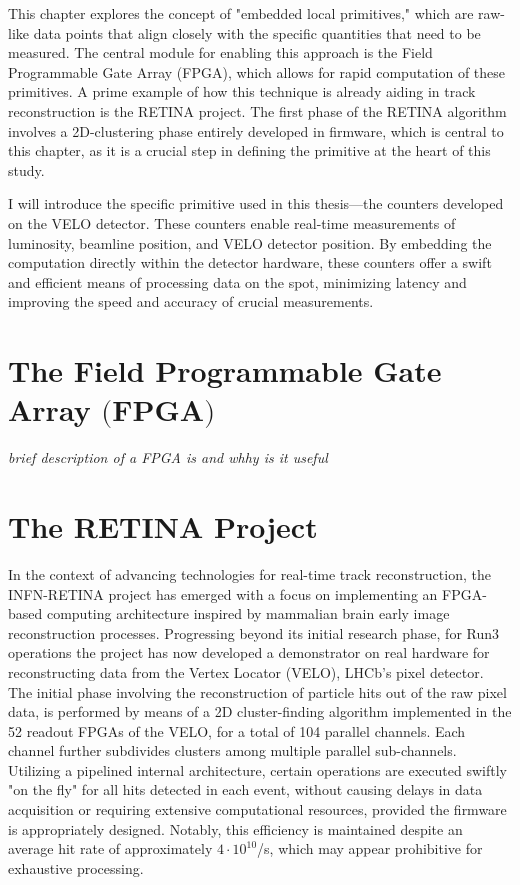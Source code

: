This chapter explores the concept of "embedded local primitives," which are raw-like data points that align closely with the specific quantities that need to be measured. The central module for enabling this approach is the Field Programmable Gate Array (FPGA), which allows for rapid computation of these primitives. A prime example of how this technique is already aiding in track reconstruction is the RETINA project. The first phase of the RETINA algorithm involves a 2D-clustering phase entirely developed in firmware, which is central to this chapter, as it is a crucial step in defining the primitive at the heart of this study.

I will introduce the specific primitive used in this thesis—the counters developed on the VELO detector. These counters enable real-time measurements of luminosity, beamline position, and VELO detector position. By embedding the computation directly within the detector hardware, these counters offer a swift and efficient means of processing data on the spot, minimizing latency and improving the speed and accuracy of crucial measurements. 


\section[The Field Programmable Gate Array]{The Field Programmable Gate Array $\bigl($FPGA$\bigr)$}
\textit{brief description of a FPGA is and whhy is it useful}

\section{The RETINA Project}
In the context of advancing technologies for real-time track reconstruction, the INFN-RETINA project has emerged with a focus on implementing an FPGA-based computing architecture inspired by  mammalian brain early image reconstruction processes. Progressing beyond its initial research phase, for Run3 operations the project has now developed a demonstrator on real hardware for reconstructing data from the Vertex Locator (VELO), LHCb's pixel detector. The initial phase involving the reconstruction of particle hits out of the raw pixel data, is performed by means of a 2D cluster-finding algorithm implemented in the 52 readout FPGAs of the VELO, for a total of 104 parallel channels. Each channel further subdivides clusters among multiple parallel sub-channels. Utilizing a pipelined internal architecture, certain operations are executed swiftly "on the fly" for all hits detected in each event, without causing delays in data acquisition or requiring extensive computational resources, provided the firmware is appropriately designed. Notably, this efficiency is maintained despite an average hit rate of approximately $4 \cdot 10^{10}$/s, which may appear prohibitive for exhaustive processing.\\

